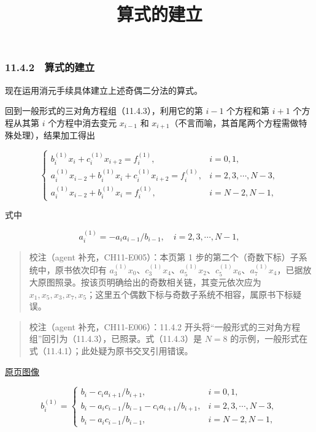 \documentclass[
  10pt,
  fontset=fandol]{ctexart}
\title{算式的建立}
\author{}
\date{}
\begin{document}
\maketitle

\subsubsection{11.4.2　算式的建立}\label{ux7b97ux5f0fux7684ux5efaux7acb}

现在运用消元手续具体建立上述奇偶二分法的算式。

回到一般形式的三对角方程组（11.4.3），利用它的第 \(i-1\) 个方程和第 \(i+1\) 个方程从其第 \(i\) 个方程中消去变元 \(x_{i-1}\) 和 \(x_{i+1}\)（不言而喻，其首尾两个方程需做特殊处理），结果加工得出

\[
\begin{cases}
b_i^{(1)}x_i+c_i^{(1)}x_{i+2}=f_i^{(1)},& i=0,1,\\
a_i^{(1)}x_{i-2}+b_i^{(1)}x_i+c_i^{(1)}x_{i+2}=f_i^{(1)},& i=2,3,\cdots,N-3,\\
a_i^{(1)}x_{i-2}+b_i^{(1)}x_i=f_i^{(1)},& i=N-2,N-1,
\end{cases}
\]

式中

\[
a_i^{(1)}=-a_i a_{i-1}/b_{i-1},\quad i=2,3,\cdots,N-1,
\]

\begin{quote}
校注（agent 补充，CH11-E005）：本页第 1 步的第二个（奇数下标）子系统中，原书依次印有 \(a_3^{(1)}x_0\)、\(c_3^{(1)}x_4\)、\(a_5^{(1)}x_2\)、\(c_5^{(1)}x_6\)、\(a_7^{(1)}x_4\)，已据放大原图照录。按该页明确给出的奇数相关链，其变元依次应为 \(x_1,x_5,x_3,x_7,x_5\)；这里五个偶数下标与奇数子系统不相容，属原书下标疑误。
\end{quote}

\begin{quote}
校注（agent 补充，CH11-E006）：11.4.2 开头将``一般形式的三对角方程组''回引为（11.4.3），已照录。式（11.4.3）是 \(N=8\) 的示例，一般形式在式（11.4.1）；此处疑为原书交叉引用错误。
\end{quote}

\href{../../source-images/pdf-291.jpeg}{原页图像}

\[
b_i^{(1)}=
\begin{cases}
b_i-c_i a_{i+1}/b_{i+1},& i=0,1,\\
b_i-a_i c_{i-1}/b_{i-1}-c_i a_{i+1}/b_{i+1},& i=2,3,\cdots,N-3,\\
b_i-a_i c_{i-1}/b_{i-1},& i=N-2,N-1,
\end{cases}
\]
\end{document}
